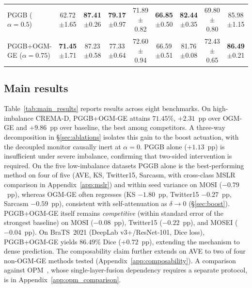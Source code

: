 \documentclass{article}
\begin{document}
\begin{table}[H]
{\begin{tabular}{l cccccccc}
\midrule
PGGB ($\alpha{=}0.5$)     & 62.72{\scriptsize$\pm$1.65} & \textbf{87.41}{\scriptsize$\pm$0.26} & \textbf{79.17}{\scriptsize$\pm$0.97} & 71.89{\scriptsize$\pm$0.82} & \textbf{66.85}{\scriptsize$\pm$0.50} & \textbf{82.44}{\scriptsize$\pm$0.35} & 69.80{\scriptsize$\pm$0.80} & 85.98{\scriptsize$\pm$1.15} \\
PGGB+OGM-GE ($\alpha{=}0.75$) & \textbf{71.45}{\scriptsize$\pm$1.71} & 87.23{\scriptsize$\pm$0.58} & 77.33{\scriptsize$\pm$0.64} & 72.60{\scriptsize$\pm$0.94} & 66.59{\scriptsize$\pm$0.51} & 81.76{\scriptsize$\pm$0.08} & 72.43{\scriptsize$\pm$0.65} & \textbf{86.49}{\scriptsize$\pm$0.21} \\
\bottomrule
\end{tabular}%
}
\end{table}


\subsection{Main results}
\label{sec:main_results}
\vspace{-1em}

Table~\ref{tab:main_results} reports results across eight benchmarks. On high-imbalance CREMA-D, PGGB+OGM-GE attains $71.45\%$, $+2.31$~pp over OGM-GE and $+9.86$~pp over baseline, the best among competitors. A three-way decomposition in \S\ref{sec:ablations} isolates this gain to the boost actuation, with the decoupled monitor causally inert at $\alpha{=}0$. PGGB alone ($+1.13$~pp) is insufficient under severe imbalance, confirming that two-sided intervention is required. On the five low-imbalance datasets PGGB alone is the best-performing method on four of five (AVE, KS, Twitter15, Sarcasm, with cross-class MSLR comparison in Appendix~\ref{app:mslr}) and within seed variance on MOSI ($-0.79$~pp), whereas OGM-GE often regresses (KS $-1.80$~pp, Twitter15 $-0.27$~pp, Sarcasm $-0.59$~pp), consistent with self-attenuation as $\delta \to 0$ (\S\ref{sec:boost}). PGGB+OGM-GE itself remains \emph{competitive} (within standard error of the strongest baseline) on MOSI ($-0.08$~pp), Twitter15 ($-0.22$~pp), and MOSEI ($-0.04$~pp). On BraTS~2021 (DeepLab v3+/ResNet-101, Dice loss), PGGB+OGM-GE yields $86.49\%$ Dice ($+0.72$~pp), extending the mechanism to dense prediction. The composability claim further extends on AVE to two of four non-OGM-GE methods tested (Appendix~\ref{app:composability}). A comparison against OPM~\citep{wei2024opm}, whose single-layer-fusion dependency requires a separate protocol, is in Appendix~\ref{app:opm_comparison}.
\vspace{-1.2em}
\end{document}

